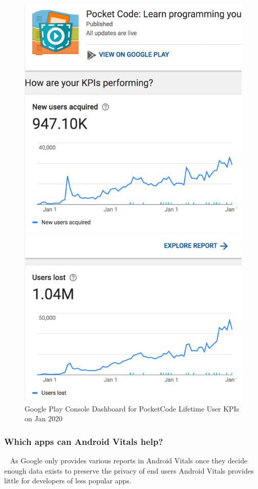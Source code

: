 \begin{figure}
    \centering
    \includegraphics[width=0.75\linewidth]{images/android-vitals-screenshots/catrobat/PocketCode-Lifetime-User-KPIs-2020-jan-24b.pdf}
    \caption{Google Play Console Dashboard for PocketCode Lifetime User KPIs on  Jan 2020}
    \label{fig:PocketCode-Lifetime-User-KPIs-2020-jan-24}
\end{figure}


\subsubsection{Which apps can Android Vitals help?}~\label{tata-which-apps-can-google-vitals-help}
As Google only provides various reports in Android Vitals once they decide enough data exists to preserve the privacy of end users Android Vitals provides little for developers of less popular apps. 

